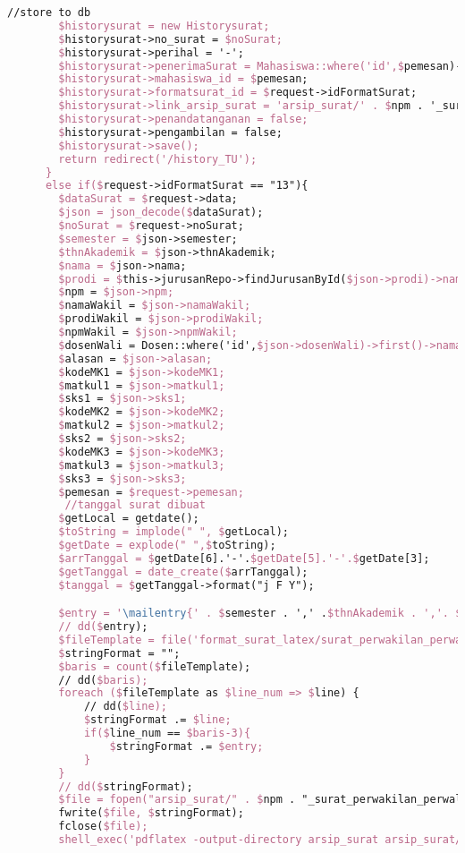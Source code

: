\begin{lstlisting}[language=tex,basicstyle=\tiny,caption=HistorysuratController.php]
        //store to db
        $historysurat = new Historysurat;
        $historysurat->no_surat = $noSurat;
        $historysurat->perihal = '-';
        $historysurat->penerimaSurat = Mahasiswa::where('id',$pemesan)->first()->dosen->nama_dosen;
        $historysurat->mahasiswa_id = $pemesan;
        $historysurat->formatsurat_id = $request->idFormatSurat;
        $historysurat->link_arsip_surat = 'arsip_surat/' . $npm . '_surat_perwakilan_perwalian_2mk.pdf';
        $historysurat->penandatanganan = false;
        $historysurat->pengambilan = false;
        $historysurat->save();
        return redirect('/history_TU');
      }
      else if($request->idFormatSurat == "13"){
        $dataSurat = $request->data;
        $json = json_decode($dataSurat);
        $noSurat = $request->noSurat;
        $semester = $json->semester;
        $thnAkademik = $json->thnAkademik;
        $nama = $json->nama;
        $prodi = $this->jurusanRepo->findJurusanById($json->prodi)->nama_jurusan;
        $npm = $json->npm;
        $namaWakil = $json->namaWakil;
        $prodiWakil = $json->prodiWakil;
        $npmWakil = $json->npmWakil;
        $dosenWali = Dosen::where('id',$json->dosenWali)->first()->nama_dosen;
        $alasan = $json->alasan;
        $kodeMK1 = $json->kodeMK1;
        $matkul1 = $json->matkul1;
        $sks1 = $json->sks1;
        $kodeMK2 = $json->kodeMK2;
        $matkul2 = $json->matkul2;
        $sks2 = $json->sks2;
        $kodeMK3 = $json->kodeMK3;
        $matkul3 = $json->matkul3;
        $sks3 = $json->sks3;
        $pemesan = $request->pemesan;
         //tanggal surat dibuat
        $getLocal = getdate();
        $toString = implode(" ", $getLocal);
        $getDate = explode(" ",$toString);
        $arrTanggal = $getDate[6].'-'.$getDate[5].'-'.$getDate[3];
        $getTanggal = date_create($arrTanggal);
        $tanggal = $getTanggal->format("j F Y");

        $entry = '\mailentry{' . $semester . ',' .$thnAkademik . ','. $nama . ',' . $prodi . ',' . $npm . ',' . $namaWakil . ',' . $prodiWakil . ',' . $npmWakil . ',' . $dosenWali . ',' . $alasan . ',' . $kodeMK1 . ',' . $matkul1 . ',' . $sks1 . ',' . $kodeMK2 . ',' . $matkul2 . ',' . $sks2 . ',' . $kodeMK3 . ',' . $matkul3 . ','. $sks3 . ',' . $tanggal . '}';
        // dd($entry);
        $fileTemplate = file('format_surat_latex/surat_perwakilan_perwalian_3mk.tex');
        $stringFormat = "";
        $baris = count($fileTemplate);
        // dd($baris);
        foreach ($fileTemplate as $line_num => $line) {
            // dd($line);
            $stringFormat .= $line;
            if($line_num == $baris-3){
                $stringFormat .= $entry;
            }
        }
        // dd($stringFormat);
        $file = fopen("arsip_surat/" . $npm . "_surat_perwakilan_perwalian_3mk.tex", "w");
        fwrite($file, $stringFormat);
        fclose($file);
        shell_exec('pdflatex -output-directory arsip_surat arsip_surat/' . $npm . '_surat_perwakilan_perwalian_3mk.tex');


\end{lstlisting}
